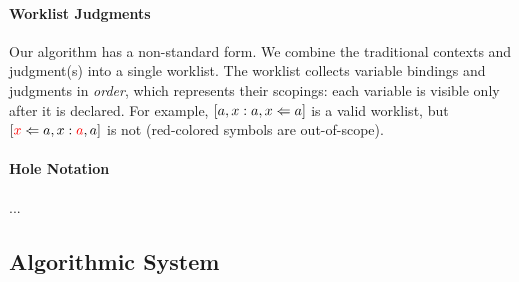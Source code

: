 \paragraph{Worklist Judgments} Our algorithm has a non-standard form.
We combine the traditional contexts and judgment(s) into a single worklist.
The worklist collects variable bindings and judgments in \emph{order}, which represents their scopings:
each variable is visible only after it is declared.
For example, $[a,x:a,x \Leftarrow a]$ is a valid worklist, but $[\textcolor{red}{x} \Leftarrow a, x:\textcolor{red}{a},a]$ is not (red-colored symbols are out-of-scope).

\paragraph{Hole Notation}...

\subsection{Algorithmic System}

\newcommand \algrule {\stepcounter{algRuleCounter}\rrule{\arabic{algRuleCounter}}}

